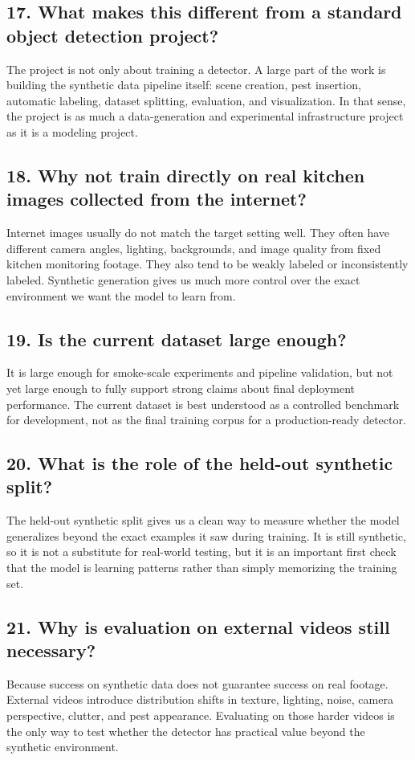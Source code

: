 \documentclass[11pt]{article}
\begin{document}
\subsection*{17. What makes this different from a standard object detection project?}
The project is not only about training a detector. A large part of the work is building the synthetic data pipeline itself: scene creation, pest insertion, automatic labeling, dataset splitting, evaluation, and visualization. In that sense, the project is as much a data-generation and experimental infrastructure project as it is a modeling project.

\subsection*{18. Why not train directly on real kitchen images collected from the internet?}
Internet images usually do not match the target setting well. They often have different camera angles, lighting, backgrounds, and image quality from fixed kitchen monitoring footage. They also tend to be weakly labeled or inconsistently labeled. Synthetic generation gives us much more control over the exact environment we want the model to learn from.

\subsection*{19. Is the current dataset large enough?}
It is large enough for smoke-scale experiments and pipeline validation, but not yet large enough to fully support strong claims about final deployment performance. The current dataset is best understood as a controlled benchmark for development, not as the final training corpus for a production-ready detector.

\subsection*{20. What is the role of the held-out synthetic split?}
The held-out synthetic split gives us a clean way to measure whether the model generalizes beyond the exact examples it saw during training. It is still synthetic, so it is not a substitute for real-world testing, but it is an important first check that the model is learning patterns rather than simply memorizing the training set.

\subsection*{21. Why is evaluation on external videos still necessary?}
Because success on synthetic data does not guarantee success on real footage. External videos introduce distribution shifts in texture, lighting, noise, camera perspective, clutter, and pest appearance. Evaluating on those harder videos is the only way to test whether the detector has practical value beyond the synthetic environment.
\end{document}
